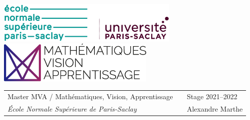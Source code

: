 \setlength{\parindent}{0pt}

\thispagestyle{empty}

\includegraphics[height=2cm]{figures/ens_ps.png} \hfill \includegraphics[height=2cm]{figures/logo_mva.eps}

\vspace{0.5cm}

\begin{tabularx}{\textwidth}{@{} l X l @{} }
{\sc Master MVA / Mathématiques, Vision, Apprentissage} & & Stage 2021--2022 \\
{\it École Normale Supérieure de Paris-Saclay} & & Alexandre \sc Marthe \\
\end{tabularx}

